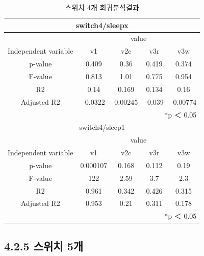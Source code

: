\documentclass[11pt
  , a4paper
  , article
  , oneside
]{memoir}
\begin{document}
\begin{table}[h!]
\begin{center}
\begin{tabular}{c|c||c||c||c}\hline
\multicolumn{5}{c}{switch4/sleepx}\\ \hline\hline
\multicolumn{1}{c|}{}& \multicolumn{4}{c}{value}\\
\cline{1-5}
Independent variable & v1 & v2c & v3r & v3w      \\ \hline\hline
p-value &  0.409 & 0.36 & 0.419 & 0.374\\ 
F-value &  0.813 & 1.01 & 0.775 & 0.954\\ 
R2 & 0.14 & 0.169 & 0.134 & 0.16\\ 
Adjusted R2 & -0.0322 & 0.00245 & -0.039 & -0.00774\\ \hline\hline
\multicolumn{5}{r}{*p ＜ 0.05} \\ \hline \hline
\multicolumn{5}{c}{switch4/sleep1}\\ \hline\hline
\multicolumn{1}{c|}{}& \multicolumn{4}{c}{value}\\
\cline{1-5}
Independent variable & v1 & v2c & v3r & v3w      \\ \hline\hline
p-value & 0.000107 & 0.168 & 0.112 & 0.19\\ 
F-value & 122 &  2.59&  3.7  &  2.3\\ 
R2 & 0.961 & 0.342& 0.426 & 0.315\\ 
Adjusted R2 & 0.953 & 0.21& 0.311 & 0.178\\ \hline

\multicolumn{5}{r}{*p ＜ 0.05} \\ \hline\hline
\end{tabular}
\caption{  스위치 4개 회귀분석결과 }
\end{center}
\end{table} 

\clearpage
\subsection{4.2.5 스위치 5개}
\end{document}
